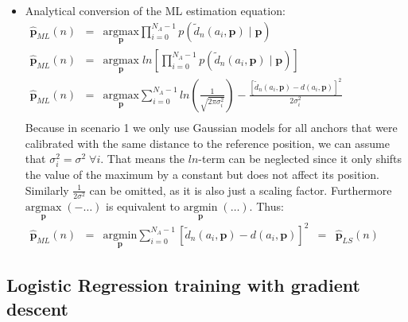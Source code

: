\documentclass{article}
\begin{document}
\begin{itemize}
    \item Analytical conversion of the ML estimation equation:\\
    
        $\begin{array}{ccccl}
        	\hat{\mathbf{p}}_{ML}(n) & = & \underset{\mathbf{p}}{\textrm{argmax}} \displaystyle \prod_{i=0}^{N_A-1} p(\tilde{d}_n(a_i,\mathbf{p})\mid\mathbf{p}) & &\\
        	\hat{\mathbf{p}}_{ML}(n) & = & \underset{\mathbf{p}}{\textrm{argmax}} \;ln \left[ \displaystyle \prod_{i=0}^{N_A-1} p(\tilde{d}_n(a_i,\mathbf{p})\mid\mathbf{p}) \right] & &\\        
        	\hat{\mathbf{p}}_{ML}(n) & = & \underset{\mathbf{p}}{\textrm{argmax}} \displaystyle \sum_{i=0}^{N_A - 1} ln \left( \frac{1}{\sqrt{2\pi\sigma_i^2}}\right) - \frac{[\tilde{d}_n(a_i,\mathbf{p})-d(a_i,\mathbf{p})]^2}{2\sigma_i^2} & &\\
        \end{array}$ \\
       
        Because in scenario 1 we only use Gaussian models for all anchors that were calibrated with the same distance to the reference position, we can assume that $\sigma_i^2 = \sigma^2 \; \forall i$. That means the $ln$-term can be neglected since it only shifts the value of the maximum by a constant but does not affect its position. Similarly $\frac{1}{2\sigma^2}$ can be omitted, as it is also just a scaling factor. Furthermore $ \underset{\mathbf{p}}{\textrm{argmax}}\;(- \dots)$ is equivalent to $\underset{\mathbf{p}}{\textrm{argmin}}\;(\dots)$. Thus: \\
        
        $\begin{array}{ccccl}
        
        	\hat{\mathbf{p}}_{ML}(n) & = & \underset{\mathbf{p}}{\textrm{argmin}} \displaystyle \sum_{i=0}^{N_A-1} [\tilde{d}_n(a_i,\mathbf{p})-d(a_i,\mathbf{p})]^2 & = & \hat{\mathbf{p}}_{LS}(n)
        	    	
        \end{array}$
                 	
\end{itemize}



\subsection{Logistic Regression training with gradient descent}
\end{document}
